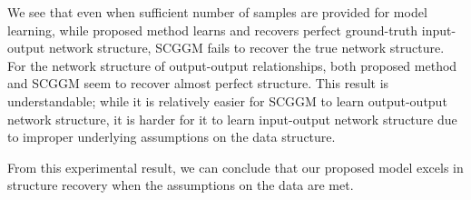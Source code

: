 \documentclass{article}
\begin{document}
We see that even when sufficient number of samples are provided for model learning, while proposed method learns and recovers perfect ground-truth input-output network structure, SCGGM fails to recover the true network structure. 
For the network structure of output-output relationships, both proposed method and SCGGM seem to recover almost perfect structure.
This result is understandable; while it is relatively easier for SCGGM to learn output-output network structure, it is harder for it to learn input-output network structure  due to improper underlying assumptions on the data structure.

From this experimental result, we can conclude that our proposed model excels in structure recovery when the assumptions on the data are met.
\end{document}
